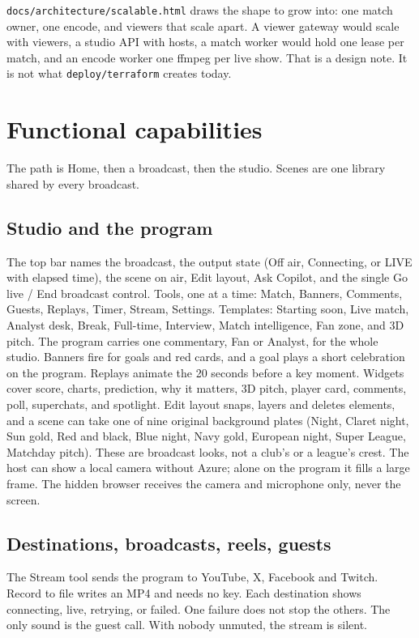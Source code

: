 \documentclass[11pt]{article}
\begin{document}
\texttt{docs/architecture/scalable.html} draws the shape to grow into: one match
owner, one encode, and viewers that scale apart.
A viewer gateway would scale with viewers, a studio API with hosts, a match worker
would hold one lease per match, and an encode worker one ffmpeg per live show.
That is a design note. It is not what \texttt{deploy/terraform} creates today.

\section{Functional capabilities}

The path is Home, then a broadcast, then the studio.
Scenes are one library shared by every broadcast.

\subsection{Studio and the program}

The top bar names the broadcast, the output state (Off air, Connecting, or LIVE
with elapsed time), the scene on air, Edit layout, Ask Copilot, and the single
Go live / End broadcast control.
Tools, one at a time: Match, Banners, Comments, Guests, Replays, Timer, Stream, Settings.
Templates: Starting soon, Live match, Analyst desk, Break, Full-time, Interview,
Match intelligence, Fan zone, and 3D pitch.
The program carries one commentary, Fan or Analyst, for the whole studio.
Banners fire for goals and red cards, and a goal plays a short celebration on the program.
Replays animate the 20 seconds before a key moment.
Widgets cover score, charts, prediction, why it matters, 3D pitch, player card,
comments, poll, superchats, and spotlight.
Edit layout snaps, layers and deletes elements, and a scene can take one of nine
original background plates (Night, Claret night, Sun gold, Red and black, Blue
night, Navy gold, European night, Super League, Matchday pitch).
These are broadcast looks, not a club's or a league's crest.
The host can show a local camera without Azure; alone on the program it fills a
large frame. The hidden browser receives the camera and microphone only, never the screen.

\subsection{Destinations, broadcasts, reels, guests}

The Stream tool sends the program to YouTube, X, Facebook and Twitch.
Record to file writes an MP4 and needs no key.
Each destination shows connecting, live, retrying, or failed.
One failure does not stop the others.
The only sound is the guest call. With nobody unmuted, the stream is silent.
\end{document}
